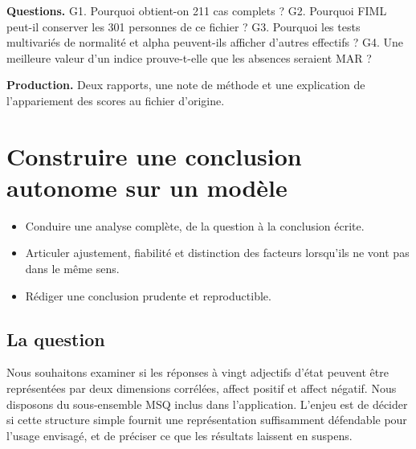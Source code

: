 \documentclass[
  french,
  11pt,
  a4paper,
  DIV=11,
  numbers=noendperiod]{scrreprt}
\providecommand{\tightlist}{%
  \setlength{\itemsep}{0pt}\setlength{\parskip}{0pt}}
\begin{document}
\textbf{Questions.} G1. Pourquoi obtient-on 211 cas complets ? G2.
Pourquoi FIML peut-il conserver les 301 personnes de ce fichier ? G3.
Pourquoi les tests multivariés de normalité et alpha peuvent-ils
afficher d'autres effectifs ? G4. Une meilleure valeur d'un indice
prouve-t-elle que les absences seraient MAR ?

\textbf{Production.} Deux rapports, une note de méthode et une
explication de l'appariement des scores au fichier d'origine.


\chapter{Construire une conclusion autonome sur un
modèle}\label{sec-etude}

\begin{tcolorbox}[enhanced jigsaw, arc=.35mm, bottomrule=.15mm, bottomtitle=1mm, breakable, colback=white, colbacktitle=quarto-callout-note-color!10!white, colframe=quarto-callout-note-color-frame, coltitle=black, left=2mm, leftrule=.75mm, opacityback=0, opacitybacktitle=0.6, rightrule=.15mm, title={Objectifs du chapitre}, titlerule=0mm, toprule=.15mm, toptitle=1mm]

\begin{itemize}
\tightlist
\item
  Conduire une analyse complète, de la question à la conclusion écrite.
\item
  Articuler ajustement, fiabilité et distinction des facteurs lorsqu'ils
  ne vont pas dans le même sens.
\item
  Rédiger une conclusion prudente et reproductible.
\end{itemize}

\end{tcolorbox}

\section{La question}\label{la-question}

Nous souhaitons examiner si les réponses à vingt adjectifs d'état
peuvent être représentées par deux dimensions corrélées, affect positif
et affect négatif. Nous disposons du sous-ensemble MSQ inclus dans
l'application. L'enjeu est de décider si cette structure simple fournit
une représentation suffisamment défendable pour l'usage envisagé, et de
préciser ce que les résultats laissent en suspens.
\end{document}
